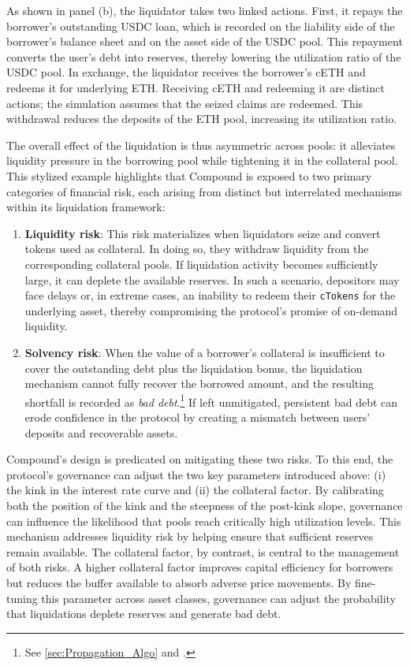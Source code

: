 \documentclass[a4paper,UKenglish,cleveref, autoref, thm-restate]{informs3}
\DeclareRobustCommand{\latestrev}[1]{{\color{red}\hypersetup{linkcolor=red,citecolor=red,urlcolor=red}#1}}
\begin{document}
As shown in panel (b), the liquidator takes two \latestrev{linked} actions. First, it repays the borrower's outstanding USDC loan, which is recorded on the liability side of the borrower's balance sheet and on the asset side of the USDC pool. This repayment converts the user's debt into reserves, thereby lowering the utilization ratio of the USDC pool. In exchange, the liquidator \latestrev{receives the borrower's cETH and redeems it for underlying ETH}. \latestrev{Receiving cETH and redeeming it are distinct actions; the simulation assumes that the seized claims are redeemed.} This withdrawal reduces the deposits of the ETH pool, increasing its utilization ratio.

The overall effect of the liquidation is thus asymmetric across pools: it alleviates liquidity pressure in the borrowing pool while tightening it in the collateral pool. This stylized example highlights that Compound is exposed to two primary categories of financial risk, each arising from distinct but interrelated mechanisms within its liquidation framework:

\begin{enumerate}
    \item \textbf{Liquidity risk}: This risk materializes when liquidators seize and convert tokens used as collateral. In doing so, they withdraw liquidity from the corresponding collateral pools. If liquidation activity becomes sufficiently large, it can deplete the available reserves. In such a scenario, depositors may face delays or, in extreme cases, an inability to redeem their \texttt{cTokens} for the underlying asset, thereby compromising the protocol’s promise of on-demand liquidity.

    \item \textbf{Solvency risk}: When the value of a borrower’s collateral is insufficient to cover the outstanding debt plus the liquidation bonus, the liquidation mechanism cannot fully recover the borrowed amount, and the resulting shortfall is recorded as \textit{bad debt}.\footnote{See \autoref{sec:Propagation_Algo} and \cite{TovanichKWP23}.} If left unmitigated, persistent bad debt can erode confidence in the protocol by creating a mismatch between users' deposits and recoverable assets.
\end{enumerate}

Compound’s design is predicated on mitigating these two risks. To this end, the protocol’s governance can adjust the two key parameters introduced above: (i) the kink in the interest rate curve and (ii) the collateral factor. By calibrating both the position of the kink and the steepness of the post-kink slope, governance can influence the likelihood that pools reach critically high utilization levels. This mechanism addresses liquidity risk by helping ensure that sufficient reserves remain available. The collateral factor, by contrast, is central to the management of both risks. A higher collateral factor improves capital efficiency for borrowers but reduces the buffer available to absorb adverse price movements. By fine-tuning this parameter across asset classes, governance can adjust the probability that liquidations deplete reserves and generate bad debt. 
\end{document}
